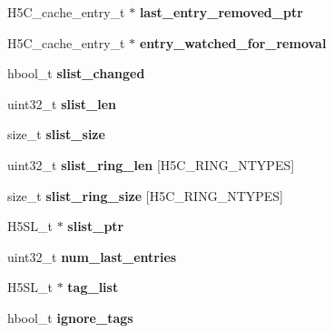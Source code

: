 \begin{DoxyCompactItemize}
H5\+C\+\_\+cache\+\_\+entry\+\_\+t $\ast$ {\bfseries last\+\_\+entry\+\_\+removed\+\_\+ptr}
\item 
\mbox{\label{struct_h5_c__t_a3ccea6f5ecc532aa89c989ca7ee2ca6c}} 
H5\+C\+\_\+cache\+\_\+entry\+\_\+t $\ast$ {\bfseries entry\+\_\+watched\+\_\+for\+\_\+removal}
\item 
\mbox{\label{struct_h5_c__t_a8d1303bcf0f9325b6519b58437fb687b}} 
hbool\+\_\+t {\bfseries slist\+\_\+changed}
\item 
\mbox{\label{struct_h5_c__t_a9f0ebb21ddd1fc7e66a62294107a0ff0}} 
uint32\+\_\+t {\bfseries slist\+\_\+len}
\item 
\mbox{\label{struct_h5_c__t_a50a61fa1a7607569e1895c9458c245f4}} 
size\+\_\+t {\bfseries slist\+\_\+size}
\item 
\mbox{\label{struct_h5_c__t_a293c36d21899ada75aeb45ca1039499d}} 
uint32\+\_\+t {\bfseries slist\+\_\+ring\+\_\+len} \mbox{[}H5\+C\+\_\+\+R\+I\+N\+G\+\_\+\+N\+T\+Y\+P\+ES\mbox{]}
\item 
\mbox{\label{struct_h5_c__t_a407ae93676a07ef3f90d4f952fa31fae}} 
size\+\_\+t {\bfseries slist\+\_\+ring\+\_\+size} \mbox{[}H5\+C\+\_\+\+R\+I\+N\+G\+\_\+\+N\+T\+Y\+P\+ES\mbox{]}
\item 
\mbox{\label{struct_h5_c__t_a08316c68aee8f9b8fbca75bb799cabfe}} 
H5\+S\+L\+\_\+t $\ast$ {\bfseries slist\+\_\+ptr}
\item 
\mbox{\label{struct_h5_c__t_aab42b6aaebeda989e5e17e44f497d15b}} 
uint32\+\_\+t {\bfseries num\+\_\+last\+\_\+entries}
\item 
\mbox{\label{struct_h5_c__t_a2d20f4f2114f1b79a3b9d3ec5936e2e4}} 
H5\+S\+L\+\_\+t $\ast$ {\bfseries tag\+\_\+list}
\item 
\mbox{\label{struct_h5_c__t_a272787b81495c28ee2c866b882efa96a}} 
hbool\+\_\+t {\bfseries ignore\+\_\+tags}
\item 
\mbox{\label{struct_h5_c__t_a7cafc9bcba0b69901ab0edce107c1e4c}} 

\end{DoxyCompactItemize}
